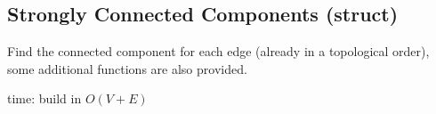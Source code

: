 \subsection{Strongly Connected Components (struct)}

Find the connected component for each edge (already in a topological order), some additional functions are also provided.

time: build in $O(V + E)$

